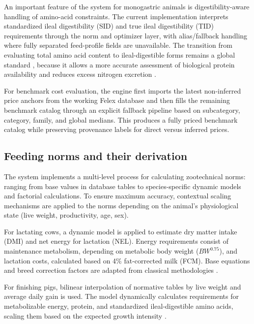 \documentclass[a4paper,fleqn]{cas-dc}
\begin{document}
An important feature of the system for monogastric animals is digestibility-aware handling of amino-acid constraints. The current implementation interprets standardized ileal digestibility (SID) and true ileal digestibility (TID) requirements through the norm and optimizer layer, with alias/fallback handling where fully separated feed-profile fields are unavailable. The transition from evaluating total amino acid content to ileal-digestible forms remains a global standard \citep{stein2007, nRC2012, nRC1994}, because it allows a more accurate assessment of biological protein availability and reduces excess nitrogen excretion \citep{pomar2021, deLange2012, vanmilgen2015}.

For benchmark cost evaluation, the engine first imports the latest non-inferred price anchors from the working Felex database and then fills the remaining benchmark catalog through an explicit fallback pipeline based on subcategory, category, family, and global medians. This produces a fully priced benchmark catalog while preserving provenance labels for direct versus inferred prices.

\subsection{Feeding norms and their derivation}\label{subsec:norms}

The system implements a multi-level process for calculating zootechnical norms: ranging from base values in database tables to species-specific dynamic models and factorial calculations. To ensure maximum accuracy, contextual scaling mechanisms are applied to the norms depending on the animal's physiological state (live weight, productivity, age, sex).

For lactating cows, a dynamic model is applied to estimate dry matter intake (DMI) and net energy for lactation (NEL). Energy requirements consist of maintenance metabolism, depending on metabolic body weight ($BW^{0.75}$), and lactation costs, calculated based on 4\% fat-corrected milk (FCM). Base equations and breed correction factors are adapted from classical methodologies \citep{nRC2001, kalashnikov2003}.

For finishing pigs, bilinear interpolation of normative tables by live weight and average daily gain is used. The model dynamically calculates requirements for metabolizable energy, protein, and standardized ileal-digestible amino acids, scaling them based on the expected growth intensity \citep{nRC2012}.
\end{document}
